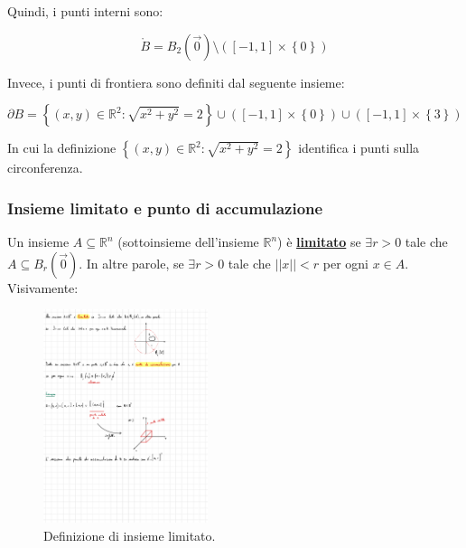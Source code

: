 \documentclass[a4paper]{article}
\begin{document}
	\newpage

	\noindent
	Quindi, i punti interni sono:
	
	\begin{equation*}
		\mathring{B} = B_{2}\left(\overrightarrow{0}\right) \setminus \left(\left[-1,1\right] \times \left\{0\right\}\right)
	\end{equation*}

	\noindent
	Invece, i punti di frontiera sono definiti dal seguente insieme:
	
	\begin{equation*}
		\partial B = \left\{\left(x,y\right) \in \mathbb{R}^{2} : \sqrt{x^{2} + y^{2}} = 2\right\} \cup \left(\left[-1,1\right] \times \left\{0\right\}\right) \cup \left(\left[-1,1\right] \times \left\{3\right\}\right)
	\end{equation*}
	
	\noindent
	In cui la definizione $\left\{\left(x,y\right) \in \mathbb{R}^{2} : \sqrt{x^{2} + y^{2}} = 2\right\}$ identifica i punti sulla circonferenza.
	
	\newpage
	
	\subsubsection{Insieme limitato e punto di accumulazione}
	
	\noindent
	Un insieme $A \subseteq \mathbb{R}^{n}$ (sottoinsieme dell'insieme $\mathbb{R}^{n}$) è \textcolor{Red3}{\textbf{\underline{limitato}}} se $\exists r > 0$ tale che $A \subseteq B_{r}\left(\overrightarrow{0}\right)$. In altre parole, se $\exists r > 0$ tale che $\Big||x|\Big| < r$ per ogni $x \in A$. Visivamente:
	
	\begin{figure}[!htp]
		\centering
		\includegraphics[width=0.43\textwidth]{img/insiemi_limitati.pdf}
		\caption{Definizione di insieme limitato.}
	\end{figure}
\end{document}
